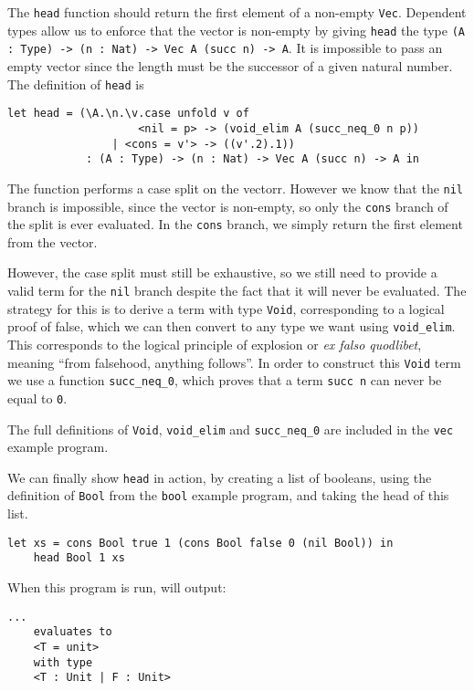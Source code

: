 \documentclass[12pt,a4paper,twoside]{report}
\begin{document}
The \lstinline{head} function should return the first element of a non-empty \lstinline{Vec}.
Dependent types allow us to enforce that the vector is non-empty by giving \lstinline{head} the type \lstinline{(A : Type) -> (n : Nat) -> Vec A (succ n) -> A}.
It is impossible to pass an empty vector since the length must be the successor of a given natural number.
The definition of \lstinline{head} is
\begin{lstlisting}[gobble=4]
    let head = (\A.\n.\v.case unfold v of
                    <nil = p> -> (void_elim A (succ_neq_0 n p))
                | <cons = v'> -> ((v'.2).1))
            : (A : Type) -> (n : Nat) -> Vec A (succ n) -> A in
\end{lstlisting}
The function performs a case split on the vectorr.
However we know that the \lstinline{nil} branch is impossible, since the vector is non-empty, so only the \lstinline{cons} branch of the split is ever evaluated.
In the \lstinline{cons} branch, we simply return the first element from the vector.

However, the case split must still be exhaustive, so we still need to provide a valid term for the \lstinline{nil} branch despite the fact that it will never be evaluated.
The strategy for this is to derive a term with type \lstinline{Void}, corresponding to a logical proof of false, which we can then convert to any type we want using \lstinline{void_elim}.
This corresponds to the logical principle of explosion or \textit{ex falso quodlibet}, meaning ``from falsehood, anything follows''.
In order to construct this \lstinline{Void} term we use a function \lstinline{succ_neq_0}, which proves that a term \lstinline{succ n} can never be equal to \lstinline{0}.

The full definitions of \lstinline{Void}, \lstinline{void_elim} and \lstinline{succ_neq_0} are included in the \texttt{vec} example program.

We can finally show \lstinline{head} in action, by creating a list of booleans, using the definition of \lstinline{Bool} from the \texttt{bool} example program, and taking the head of this list.
\begin{lstlisting}[gobble=4]
    let xs = cons Bool true 1 (cons Bool false 0 (nil Bool)) in
    head Bool 1 xs
\end{lstlisting}
When this program is run, \pimu{} will output:
\begin{lstlisting}[gobble=4]
    ...
    evaluates to
    <T = unit>
    with type
    <T : Unit | F : Unit>
\end{lstlisting}
\end{document}
